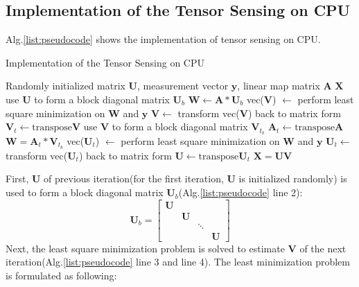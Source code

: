 \documentclass[futureinternet,article,submit,moreauthors,pdftex,10pt,a4paper]{Definitions/mdpi}
\theoremstyle{plain}
\theoremstyle{definition}
\theoremstyle{remark}
\begin{document}
\subsection{Implementation of the Tensor Sensing on CPU}
Alg.\ref{list:pseudocode} shows the implementation of tensor sensing on CPU. 
\begin{algorithm}
\caption{Implementation of the Tensor Sensing on CPU}
\label{list:pseudocode}
\begin{algorithmic}[1]
    \Require Randomly initialized matrix $\mathbf{U}$, measurement vector $\mathbf{y}$, linear map matrix $\mathbf{A}$
    \Ensure $\mathbf{X}$
        \State use $\mathbf{U}$ to form a block diagonal matrix $\mathbf{U}_b$
        \State $\mathbf{W}\gets \mathbf{A} \ast \mathbf{U}_{b}$
        \State vec($\mathbf{V}$) $\gets$ perform least square minimization on $\mathbf{W}$ and $\mathbf{y}$
        \State $\mathbf{V} \gets$  transform vec($\mathbf{V}$) back to matrix form
        \State $\mathbf{V}_t \gets \text{transpose} \mathbf{V}$
        \State use $\mathbf{V}$ to form a block diagonal matrix $\mathbf{V}_{t_b}$
        \State $\mathbf{A}_t \gets \text{transpose} \mathbf{A}$
        \State $\mathbf{W} = \mathbf{A}_t \ast \mathbf{V}_{t_{b}}$
        \State vec($\mathbf{U}_t$) $\gets$ perform least square minimization on $\mathbf{W}$ and $\mathbf{y}$
        \State $\mathbf{U}_t \gets$  transform vec($\mathbf{U}_t$) back to matrix form
        \State $\mathbf{U} \gets \text{transpose} \mathbf{U}_t$
    \EndFor
    \State \Return $\mathbf{X} = \mathbf{U} \mathbf{V}$
    \end{algorithmic}
    \end{algorithm}
    First, $\mathbf{U}$ of previous iteration(for the first iteration, $\mathbf{U}$ is initialized randomly) is used to form a block diagonal matrix $\mathbf{U}_b$(Alg.\ref{list:pseudocode} line 2):
    \begin{equation}
        \label{eqa:diag}
        \mathbf{U}_b = 
        \begin{bmatrix}
            \mathbf{U} & & & \\
            & \mathbf{U} & & \\
            & & \ddots & \\
            & & & \mathbf{U}
        \end{bmatrix}
    \end{equation}
    Next, the least square minimization problem is solved to estimate $\mathbf{V}$ of the next iteration(Alg.\ref{list:pseudocode} line 3 and line 4). The least minimization problem is formulated as following:
\end{document}
